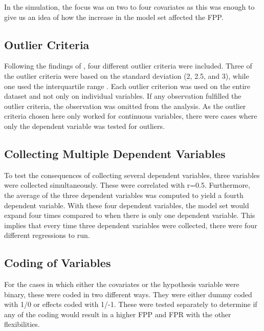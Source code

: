 

In the simulation, the focus was on two to four covariates as this was enough to give us an idea of how the increase in the model set affected the FPP. 

\subsection{Outlier Criteria}
Following the findings of \cite{Leyes2013}, four different outlier criteria were included. Three of the outlier criteria were based on the standard deviation (2, 2.5, and 3), while one used the interquartile range \citep{Rousseeuw2011}. Each outlier criterion was used on the entire dataset and not only on individual variables. If any observation fulfilled the outlier criteria, the observation was omitted from the analysis. As the outlier criteria chosen here only worked for continuous variables, there were cases where only the dependent variable was tested for outliers.

\subsection{Collecting Multiple Dependent Variables}
To test the consequences of collecting several dependent variables, three variables were collected simultaneously. These were correlated with r=0.5. Furthermore, the average of the three dependent variables was computed to yield a fourth dependent variable. With these four dependent variables, the model set would expand four times compared to when there is only one dependent variable. This implies that every time three dependent variables were collected, there were four different regressions to run.

\subsection{Coding of Variables}
For the cases in which either the covariates or the hypothesis variable were binary, these were coded in two different ways. They were either dummy coded with 1/0 or effects coded with 1/-1. These were tested separately to determine if any of the coding would result in a higher FPP and FPR with the other flexibilities.

